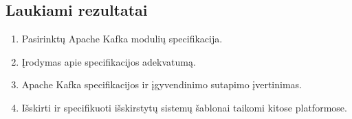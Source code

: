 \documentclass{VUMIFPSmagistrinis}
\begin{document}
	\subsection{Laukiami rezultatai}
		\begin{enumerate}
			\item{Pasirinktų Apache Kafka modulių specifikacija.}
			\item{Įrodymas apie specifikacijos adekvatumą.}
			\item{Apache Kafka specifikacijos ir įgyvendinimo sutapimo įvertinimas.}
			\item{Išskirti ir specifikuoti išskirstytų sistemų šablonai taikomi kitose platformose.}
		\end{enumerate}
	
	\printbibliography[heading=bibintoc] 
\end{document}
